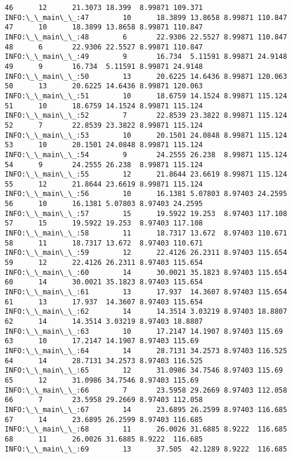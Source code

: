 \documentclass[11pt]{article}
\begin{document}
\begin{Verbatim}[commandchars=\\\{\}]
46      12      21.3073 18.399  8.99871 109.371
INFO:\_\_main\_\_:47        10      18.3899 13.8658 8.99871 110.847
47      10      18.3899 13.8658 8.99871 110.847
INFO:\_\_main\_\_:48        6       22.9306 22.5527 8.99871 110.847
48      6       22.9306 22.5527 8.99871 110.847
INFO:\_\_main\_\_:49        9       16.734  5.11591 8.99871 24.9148
49      9       16.734  5.11591 8.99871 24.9148
INFO:\_\_main\_\_:50        13      20.6225 14.6436 8.99871 120.063
50      13      20.6225 14.6436 8.99871 120.063
INFO:\_\_main\_\_:51        10      18.6759 14.1524 8.99871 115.124
51      10      18.6759 14.1524 8.99871 115.124
INFO:\_\_main\_\_:52        7       22.8539 23.3822 8.99871 115.124
52      7       22.8539 23.3822 8.99871 115.124
INFO:\_\_main\_\_:53        10      20.1501 24.0848 8.99871 115.124
53      10      20.1501 24.0848 8.99871 115.124
INFO:\_\_main\_\_:54        9       24.2555 26.238  8.99871 115.124
54      9       24.2555 26.238  8.99871 115.124
INFO:\_\_main\_\_:55        12      21.8644 23.6619 8.99871 115.124
55      12      21.8644 23.6619 8.99871 115.124
INFO:\_\_main\_\_:56        10      16.1381 5.07803 8.97403 24.2595
56      10      16.1381 5.07803 8.97403 24.2595
INFO:\_\_main\_\_:57        15      19.5922 19.253  8.97403 117.108
57      15      19.5922 19.253  8.97403 117.108
INFO:\_\_main\_\_:58        11      18.7317 13.672  8.97403 110.671
58      11      18.7317 13.672  8.97403 110.671
INFO:\_\_main\_\_:59        12      22.4126 26.2311 8.97403 115.654
59      12      22.4126 26.2311 8.97403 115.654
INFO:\_\_main\_\_:60        14      30.0021 35.1823 8.97403 115.654
60      14      30.0021 35.1823 8.97403 115.654
INFO:\_\_main\_\_:61        13      17.937  14.3607 8.97403 115.654
61      13      17.937  14.3607 8.97403 115.654
INFO:\_\_main\_\_:62        14      14.3514 3.03219 8.97403 18.8807
62      14      14.3514 3.03219 8.97403 18.8807
INFO:\_\_main\_\_:63        10      17.2147 14.1907 8.97403 115.69
63      10      17.2147 14.1907 8.97403 115.69
INFO:\_\_main\_\_:64        14      28.7131 34.2573 8.97403 116.525
64      14      28.7131 34.2573 8.97403 116.525
INFO:\_\_main\_\_:65        12      31.0986 34.7546 8.97403 115.69
65      12      31.0986 34.7546 8.97403 115.69
INFO:\_\_main\_\_:66        7       23.5958 29.2669 8.97403 112.058
66      7       23.5958 29.2669 8.97403 112.058
INFO:\_\_main\_\_:67        14      23.6895 26.2599 8.97403 116.685
67      14      23.6895 26.2599 8.97403 116.685
INFO:\_\_main\_\_:68        11      26.0026 31.6885 8.9222  116.685
68      11      26.0026 31.6885 8.9222  116.685
INFO:\_\_main\_\_:69        13      37.505  42.1289 8.9222  116.685

\end{Verbatim}
\end{document}

